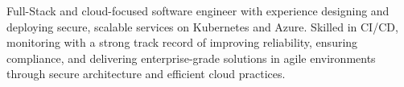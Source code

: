 

\begin{cvparagraph}

Full-Stack and cloud-focused software engineer with experience designing and deploying secure, scalable services on Kubernetes and Azure. Skilled in CI/CD, monitoring with a strong track record of improving reliability, ensuring compliance, and delivering enterprise-grade solutions in agile environments through secure architecture and efficient cloud practices.
\end{cvparagraph}